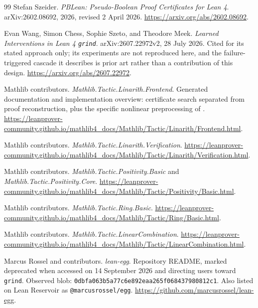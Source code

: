 \begin{thebibliography}{99}
Stefan Szeider. \emph{PBLean: Pseudo-Boolean Proof Certificates for Lean 4}.
arXiv:2602.08692, 2026, revised 2 April 2026.
\url{https://arxiv.org/abs/2602.08692}.

Evan Wang, Simon Chess, Sophie Szeto, and Theodore Meek.
\emph{Learned Interventions in Lean 4 \texttt{grind}}.
arXiv:2607.22972v2, 28 July 2026. Cited for its stated approach only; its
experiments are not reproduced here, and the failure-triggered cascade it
describes is prior art rather than a contribution of this design.
\url{https://arxiv.org/abs/2607.22972}.


Mathlib contributors. \emph{Mathlib.Tactic.Linarith.Frontend}. Generated
documentation and implementation overview: certificate search separated from
proof reconstruction, plus the specific nonlinear preprocessing of
.
\url{https://leanprover-community.github.io/mathlib4_docs/Mathlib/Tactic/Linarith/Frontend.html}.

Mathlib contributors. \emph{Mathlib.Tactic.Linarith.Verification}.
\url{https://leanprover-community.github.io/mathlib4_docs/Mathlib/Tactic/Linarith/Verification.html}.

Mathlib contributors. \emph{Mathlib.Tactic.Positivity.Basic} and
\emph{Mathlib.Tactic.Positivity.Core}.
\url{https://leanprover-community.github.io/mathlib4_docs/Mathlib/Tactic/Positivity/Basic.html}.

Mathlib contributors. \emph{Mathlib.Tactic.Ring.Basic}.
\url{https://leanprover-community.github.io/mathlib4_docs/Mathlib/Tactic/Ring/Basic.html}.

Mathlib contributors. \emph{Mathlib.Tactic.LinearCombination}.
\url{https://leanprover-community.github.io/mathlib4_docs/Mathlib/Tactic/LinearCombination.html}.


Marcus Rossel and contributors. \emph{lean-egg}. Repository README, marked
deprecated when accessed on 14 September 2026 and directing users toward
\texttt{grind}. Observed blob:
\texttt{0dbfa063b5a77c6e892eaa265f068437980812c1}. Also listed on Lean
Reservoir as \texttt{@marcusrossel/egg}.
\url{https://github.com/marcusrossel/lean-egg}.


\end{thebibliography}
